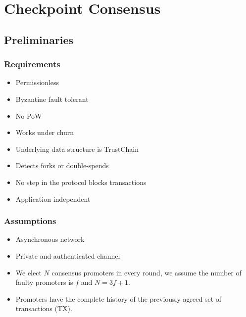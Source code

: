 \chapter{Checkpoint Consensus}\label{ch:consensus}

\section{Preliminaries}

\subsection{Requirements}
\begin{itemize}
\item Permissionless
\item Byzantine fault tolerant
\item No PoW
\item Works under churn
\item Underlying data structure is TrustChain
\item Detects forks or double-spends
\item No step in the protocol blocks transactions
\item Application independent
\end{itemize}

\subsection{Assumptions}
\begin{itemize}
\item Asynchronous network
\item Private and authenticated channel
\item We elect $N$ consensus promoters in every round, we assume the number of
  faulty promoters is $f$ and $N = 3f + 1$.
\item Promoters have the complete history of the previously agreed set of
  transactions (TX).
\end{itemize}

